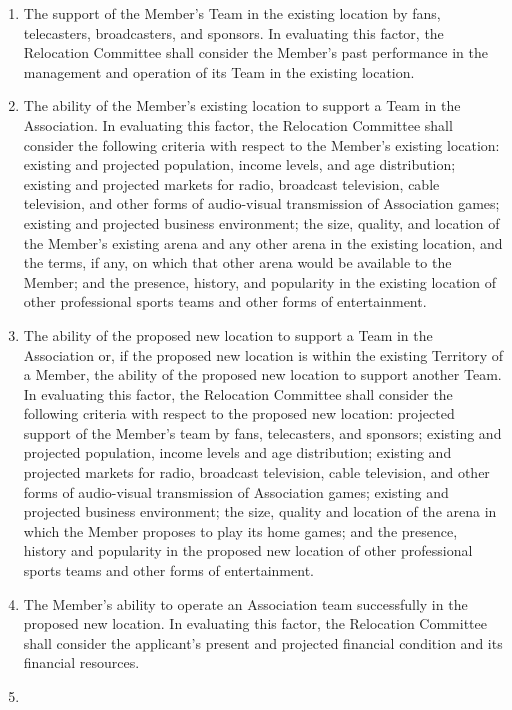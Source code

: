 \documentclass[]{book}
\providecommand{\tightlist}{%
  \setlength{\itemsep}{0pt}\setlength{\parskip}{0pt}}
\begin{document}
\begin{enumerate}
  \begin{enumerate}
  \def\labelenumii{(\roman{enumii})}
  \tightlist
  \item
    The support of the Member's Team in the existing location by fans, telecasters, broadcasters, and sponsors. In evaluating this factor, the Relocation Committee shall consider the Member's past performance in the management and operation of its Team in the existing location.
  \item
    The ability of the Member's existing location to support a Team in the Association. In evaluating this factor, the Relocation Committee shall consider the following criteria with respect to the Member's existing location: existing and projected population, income levels, and age distribution; existing and projected markets for radio, broadcast television, cable television, and other forms of audio-visual transmission of Association games; existing and projected business environment; the size, quality, and location of the Member's existing arena and any other arena in the existing location, and the terms, if any, on which that other arena would be available to the Member; and the presence, history, and popularity in the existing location of other professional sports teams and other forms of entertainment.
  \item
    The ability of the proposed new location to support a Team in the Association or, if the proposed new location is within the existing Territory of a Member, the ability of the proposed new location to support another Team. In evaluating this factor, the Relocation Committee shall consider the following criteria with respect to the proposed new location: projected support of the Member's team by fans, telecasters, and sponsors; existing and projected population, income levels and age distribution; existing and projected markets for radio, broadcast television, cable television, and other forms of audio-visual transmission of Association games; existing and projected business environment; the size, quality and location of the arena in which the Member proposes to play its home games; and the presence, history and popularity in the proposed new location of other professional sports teams and other forms of entertainment.
  \item
    The Member's ability to operate an Association team successfully in the proposed new location. In evaluating this factor, the Relocation Committee shall consider the applicant's present and projected financial condition and its financial resources.
  \item

\end{enumerate}
\end{enumerate}
\end{document}
